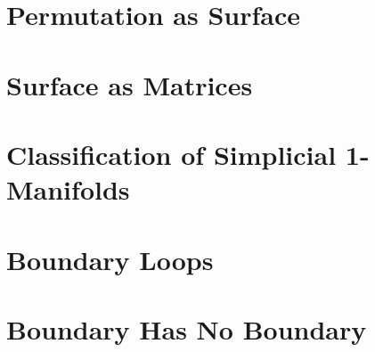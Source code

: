 \section{Permutation as Surface}

\section{Surface as Matrices}

\section{Classiﬁcation of Simplicial 1-Manifolds}

\section{Boundary Loops}

\section{Boundary Has No Boundary}

